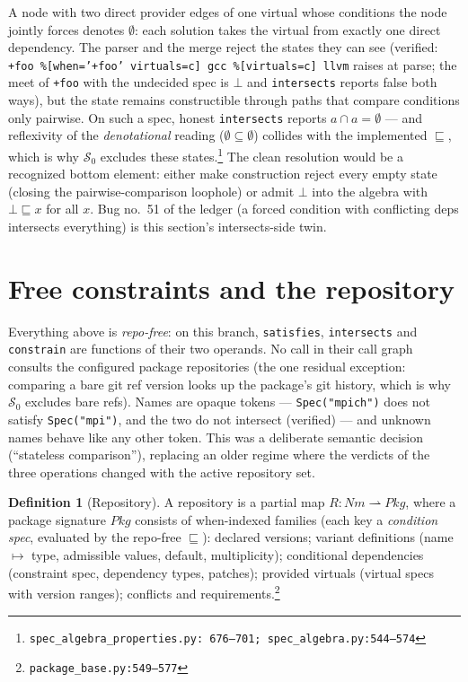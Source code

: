 \documentclass[11pt]{article}
\theoremstyle{definition}
\newtheorem{definition}[theorem]{Definition}
\theoremstyle{remark}
\newcommand{\sat}{\sqsubseteq}
\newcommand{\Spec}{\mathcal{S}}
\newcommand{\Names}{\mathit{Nm}}
\newcommand{\code}[1]{\texttt{#1}}
\newcommand{\src}[1]{\footnote{\code{#1}}}
\begin{document}
A node with two direct provider edges of one virtual whose conditions the
node jointly forces denotes $\emptyset$: each solution takes the virtual from
exactly one direct dependency.  The parser and the merge reject the states
they can see (verified: \code{+foo \%[when='+foo' virtuals=c] gcc
\%[virtuals=c] llvm} raises at parse; the meet of \code{+foo} with the
undecided spec is $\bot$ and \code{intersects} reports false both ways), but
the state remains constructible through paths that compare conditions only
pairwise.  On such a spec, honest \code{intersects} reports
$a \cap a = \emptyset$ --- and reflexivity of the \emph{denotational} reading
($\emptyset \subseteq \emptyset$) collides with the implemented $\sat$, which
is why $\Spec_0$ excludes these states.\src{spec\_algebra\_properties.py:%
676--701; spec\_algebra.py:544--574}  The clean resolution would be a
recognized bottom element: either make construction reject every empty state
(closing the pairwise-comparison loophole) or admit $\bot$ into the algebra
with $\bot \sat x$ for all $x$.  Bug no.~51 of the ledger (a forced
condition with conflicting deps intersects everything) is this section's
intersects-side twin.

\section{Free constraints and the repository}\label{sec:repo}

Everything above is \emph{repo-free}: on this branch, \code{satisfies},
\code{intersects} and \code{constrain} are functions of their two operands.
No call in their call graph consults the configured package repositories
(the one residual exception: comparing a bare git ref version looks up the
package's git history, which is why $\Spec_0$ excludes bare refs).  Names are
opaque tokens --- \code{Spec("mpich")} does not satisfy \code{Spec("mpi")},
and the two do not intersect (verified) --- and unknown names behave like any
other token.  This was a deliberate semantic decision (``stateless
comparison''), replacing an older regime where the verdicts of the three
operations changed with the active repository set.

\begin{definition}[Repository]\label{def:repo}
A repository is a partial map $R : \Names \rightharpoonup \mathit{Pkg}$,
where a package signature $\mathit{Pkg}$ consists of when-indexed families
(each key a \emph{condition spec}, evaluated by the repo-free $\sat$):
declared versions; variant definitions (name $\mapsto$ type, admissible
values, default, multiplicity); conditional dependencies (constraint spec,
dependency types, patches); provided virtuals (virtual specs with version
ranges); conflicts and requirements.\src{package\_base.py:549--577}
\end{definition}
\end{document}
